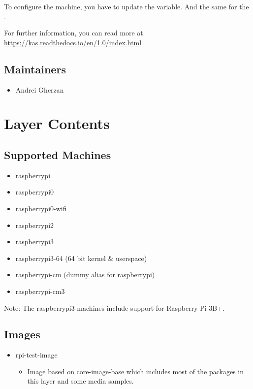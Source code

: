 \documentclass[letterpaper,10pt,english]{sphinxmanual}
\begin{document}
To configure the machine, you have to update the  variable.
And the same for the .

For further information, you can read more at \href{https://kas.readthedocs.io/en/1.0/index.html}{https://kas.readthedocs.io/en/1.0/index.html}


\section{Maintainers}
\label{readme:maintainers}\begin{itemize}
\item {} 
Andrei Gherzan 

\end{itemize}


\chapter{Layer Contents}
\label{layer-contents:layer-contents}\label{layer-contents::doc}

\section{Supported Machines}
\label{layer-contents:supported-machines}\begin{itemize}
\item {} 
raspberrypi

\item {} 
raspberrypi0

\item {} 
raspberrypi0-wifi

\item {} 
raspberrypi2

\item {} 
raspberrypi3

\item {} 
raspberrypi3-64 (64 bit kernel \& userspace)

\item {} 
raspberrypi-cm (dummy alias for raspberrypi)

\item {} 
raspberrypi-cm3

\end{itemize}

Note: The raspberrypi3 machines include support for Raspberry Pi 3B+.


\section{Images}
\label{layer-contents:images}\begin{itemize}
\item {} 
rpi-test-image
\begin{itemize}
\item {} 
Image based on core-image-base which includes most of the packages in this
layer and some media samples.

\end{itemize}

\end{itemize}
\end{document}
